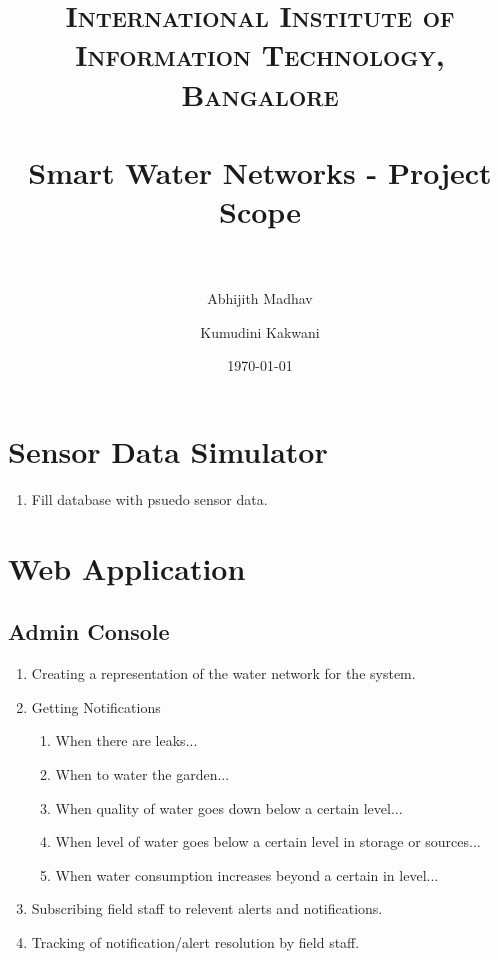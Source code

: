 \documentclass[paper=a4, fontsize=11pt]{scrartcl} %
\title{	
\normalfont \normalsize 
\textsc{International Institute of Information Technology, Bangalore} \\ [25pt] %
\horrule{0.5pt} \\[0.4cm] %
\huge Smart Water Networks - Project Scope \\ %
\horrule{2pt} \\[0.5cm] %
}
\author{Abhijith Madhav \and Kumudini Kakwani} %
\date{\normalsize\today} %
\numberwithin{equation}{section} %
\numberwithin{figure}{section} %
\numberwithin{table}{section} %
\begin{document}
\maketitle %


\section{Sensor Data Simulator}
\begin{enumerate}
\item
Fill database with psuedo sensor data.
\end{enumerate}

\section{Web Application}

\subsection{Admin Console}
\begin{enumerate}
\item
Creating a representation of the water network for the system.
\item 
Getting Notifications
\begin{enumerate}
\item
When there are leaks...
\item
When to water the garden...
\item
When quality of water goes down below a certain level...
\item
When level of water goes below a certain level in storage or sources...
\item
When water consumption increases beyond a certain in level...
\end{enumerate}
\item
Subscribing field staff to relevent alerts and notifications.
\item
Tracking of notification/alert resolution by field staff.
\end{enumerate}
\end{document}
